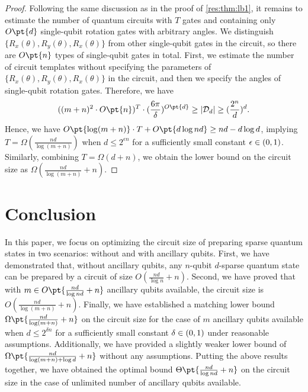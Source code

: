 \documentclass[a4paper,UKenglish,cleveref, autoref, thm-restate]{lipics-v2021}
\DeclarePairedDelimiter\rbra{\lparen}{\rparen}
\newcommand{\bo}{O\pt}
\newcommand{\om}{\Omega\pt}
\newcommand{\ta}{\Theta\pt}
\begin{document}
\begin{proof}
    Following the same discussion as in the proof of \cref{res:thm:lb1}, it remains to estimate the number of quantum circuits with  $T$ gates and containing only $\bo{d}$ single-qubit rotation gates with arbitrary angles. We distinguish $ \{R_x(\theta), R_y(\theta), R_x(\theta)\} $ from other single-qubit gates in the circuit, so there are $\bo{n}$ types of single-qubit gates in total. First, we estimate the number of circuit templates without specifying the parameters of $ \{R_x(\theta), R_y(\theta), R_x(\theta)\} $ in the circuit, and then we specify the angles of single-qubit rotation gates. Therefore, we have
\begin{align}
((m + n)^2 \cdot \bo{n})^T \cdot (\frac{6\pi}{\delta})^{\bo{d}} \geq |\mathcal{D}_d| \geq (\frac{2^n}{d})^d.
\end{align}
Hence, we have $\bo{\log (m+n)}\cdot T + \bo{d \log nd} \geq nd - d\log d$, implying $T= \Omega(\frac{nd}{\log(m + n)})$ when $d \leq 2^{\epsilon n}$ for a sufficiently small constant $\epsilon \in \rbra{0, 1}$. Similarly, combining $T = \Omega(d + n)$, we obtain the lower bound on the circuit size as $\Omega(\frac{nd}{\log(m+n)} + n)$.
\end{proof}

\section{Conclusion}\label{sec:conclusion}

In this paper, we focus on optimizing the circuit size of preparing sparse quantum states in two scenarios: without  and with ancillary qubits. First, we have demonstrated that, without ancillary qubits, any $n$-qubit $d$-sparse quantum state can be prepared by a circuit of size $O(\frac{nd}{\log n} + n)$. Second,  we have proved that with $m \in \bo{\frac{nd}{\log nd} + n}$ ancillary qubits available, the circuit size is $O(\frac{nd}{\log (m+n)} + n)$. Finally, we have established a matching lower bound  $\om{\frac{nd}{\log(m + n)} + n}$ on the circuit size for the case of $m$ ancillary qubits available when $d \leq 2^{\delta n}$ for a sufficiently small constant $\delta \in \rbra{0, 1}$ under reasonable assumptions. Additionally, we have provided a slightly weaker lower bound of $\om{\frac{nd}{\log(m + n) + \log d} + n}$ without any assumptions. Putting the above results together, we have obtained the optimal bound $\ta{\frac{nd}{\log nd} + n}$ on the circuit size in the case of unlimited  number of ancillary qubits  available.  
\end{document}
